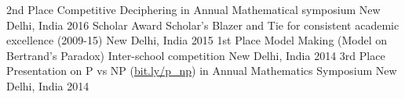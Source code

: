\begin{cvhonors}
  \cvhonor
    {2nd Place}
    {Competitive Deciphering in Annual Mathematical symposium}
    {New Delhi, India}
    {2016}
  \cvhonor
    {Scholar Award}
    {Scholar’s Blazer and Tie for consistent academic excellence (2009-15)}
    {New Delhi, India}
    {2015}
  \cvhonor
    {1st Place}
    {Model Making (Model on Bertrand’s Paradox) Inter-school competition}
    {New Delhi, India}
    {2014}
  \cvhonor
    {3rd Place}
    {Presentation on P vs NP (\url{bit.ly/p_np}) in Annual Mathematics Symposium}
    {New Delhi, India}
    {2014}
\end{cvhonors}

